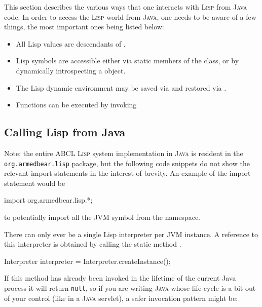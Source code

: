 \documentclass[10pt]{book}
\begin{document}
This section describes the various ways that one interacts with \textsc{Lisp}
from \textsc{Java} code.  In order to access the \textsc{Lisp} world from \textsc{Java}, one needs
to be aware of a few things, the most important ones being listed below:

\begin{itemize}
\item All Lisp values are descendants of .
\item Lisp symbols are accessible either via static members of the
   class, or by dynamically introspecting a 
  object.
\item The Lisp dynamic environment may be saved via
   and restored via
  .
\item Functions can be executed by invoking 
\end{itemize}

\subsection{Calling Lisp from Java}
\label{sec:calling-lisp-from-java}

Note: the entire \textsc{ABCL} \textsc{Lisp} system implementation in
\textsc{Java} is resident in the \texttt{org.armedbear.lisp} package,
but the following code snippets do not show the relevant import
statements in the interest of brevity.  An example of the import
statement would be
\begin{listing-java}
  import org.armedbear.lisp.*;
\end{listing-java}
to potentially import all the JVM symbol from the 
namespace.

There can only ever be a single Lisp interpreter per \textsc{JVM} instance.  A
reference to this interpreter is obtained by calling the static method
.

\begin{listing-java}
  Interpreter interpreter = Interpreter.createInstance();
\end{listing-java}

If this method has already been invoked in the lifetime of the current
Java process it will return \texttt{null}, so if you are writing \textsc{Java}
whose life-cycle is a bit out of your control (like in a \textsc{Java} servlet),
a safer invocation pattern might be:
\end{document}
